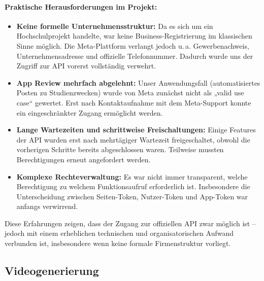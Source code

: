 \documentclass[a4paper,12pt]{article}
\begin{document}
\paragraph{Praktische Herausforderungen im Projekt:}
\begin{itemize}
    \item \textbf{Keine formelle Unternehmensstruktur:} Da es sich um ein Hochschulprojekt handelte, war keine Business-Registrierung im klassischen Sinne möglich. Die Meta-Plattform verlangt jedoch u.\,a. Gewerbenachweis, Unternehmensadresse und offizielle Telefonnummer. Dadurch wurde uns der Zugriff zur API vorerst vollständig verwehrt.

    \item \textbf{App Review mehrfach abgelehnt:} Unser Anwendungsfall (automatisiertes Posten zu Studienzwecken) wurde von Meta zunächst nicht als „valid use case“ gewertet. Erst nach Kontaktaufnahme mit dem Meta-Support konnte ein eingeschränkter Zugang ermöglicht werden.

    \item \textbf{Lange Wartezeiten und schrittweise Freischaltungen:} Einige Features der API wurden erst nach mehrtägiger Wartezeit freigeschaltet, obwohl die vorherigen Schritte bereits abgeschlossen waren. Teilweise mussten Berechtigungen erneut angefordert werden.

    \item \textbf{Komplexe Rechteverwaltung:} Es war nicht immer transparent, welche Berechtigung zu welchem Funktionsaufruf erforderlich ist. Insbesondere die Unterscheidung zwischen Seiten-Token, Nutzer-Token und App-Token war anfangs verwirrend.
\end{itemize}

Diese Erfahrungen zeigen, dass der Zugang zur offiziellen API zwar möglich ist – jedoch mit einem erheblichen technischen und organisatorischen Aufwand verbunden ist, insbesondere wenn keine formale Firmenstruktur vorliegt.


\subsection{Videogenerierung}
\end{document}
